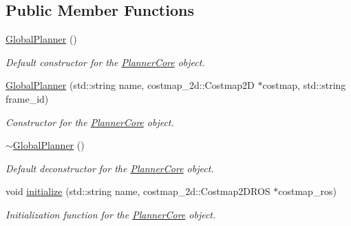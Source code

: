 \subsection*{Public Member Functions}
\begin{DoxyCompactItemize}
\item 
\mbox{\label{classglobal__planner_1_1_global_planner_a69b66f59b51665f826a51587afa720ff}} 
\mbox{\hyperlink{classglobal__planner_1_1_global_planner_a69b66f59b51665f826a51587afa720ff}{Global\+Planner}} ()
\begin{DoxyCompactList}\small\item\em Default constructor for the \mbox{\hyperlink{class_planner_core}{Planner\+Core}} object. \end{DoxyCompactList}\item 
\mbox{\hyperlink{classglobal__planner_1_1_global_planner_aaeb34983765b053861cbef08e9614bb5}{Global\+Planner}} (std\+::string name, costmap\+\_\+2d\+::\+Costmap2D $\ast$costmap, std\+::string frame\+\_\+id)
\begin{DoxyCompactList}\small\item\em Constructor for the \mbox{\hyperlink{class_planner_core}{Planner\+Core}} object. \end{DoxyCompactList}\item 
\mbox{\label{classglobal__planner_1_1_global_planner_aa49ab75794afdbec6aa7c6c3902de4c0}} 
\mbox{\hyperlink{classglobal__planner_1_1_global_planner_aa49ab75794afdbec6aa7c6c3902de4c0}{$\sim$\+Global\+Planner}} ()
\begin{DoxyCompactList}\small\item\em Default deconstructor for the \mbox{\hyperlink{class_planner_core}{Planner\+Core}} object. \end{DoxyCompactList}\item 
void \mbox{\hyperlink{classglobal__planner_1_1_global_planner_a280ebb6723d46b462eb66ec73a2fe266}{initialize}} (std\+::string name, costmap\+\_\+2d\+::\+Costmap2\+D\+R\+OS $\ast$costmap\+\_\+ros)
\begin{DoxyCompactList}\small\item\em Initialization function for the \mbox{\hyperlink{class_planner_core}{Planner\+Core}} object. \end{DoxyCompactList}\item 
\mbox{\label{classglobal__planner_1_1_global_planner_af3ade8f9f487fe2ddd109f0845a6ffb2}} 

\end{DoxyCompactItemize}
